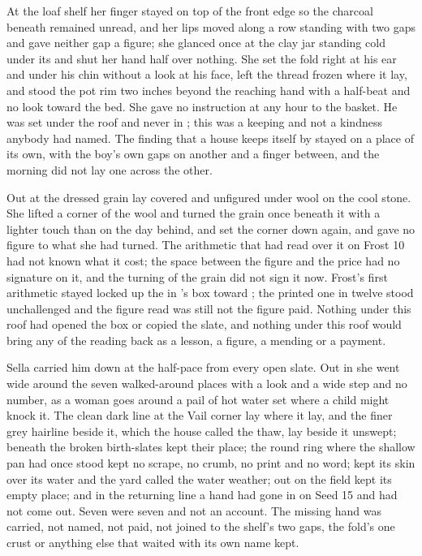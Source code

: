 At the loaf shelf her finger stayed on top of the front edge so the charcoal beneath remained unread, and her lips moved along a row standing with two gaps and gave neither gap a figure; she glanced once at the clay jar standing cold under its  and shut her hand half over nothing. She set the fold right at his ear and under his chin without a look at his face, left the thread frozen where it lay, and stood the pot rim two inches beyond the reaching hand with a half-beat and no look toward the bed. She gave no instruction at any hour to the basket. He was set under the roof and never in ; this was a keeping and not a kindness anybody had named. The finding that a house keeps itself by  stayed on a place of its own, with the boy's own gaps on another and a finger between, and the morning did not lay one across the other.

Out at  the dressed grain lay covered and unfigured under wool on the cool stone. She lifted a corner of the wool and turned the grain once beneath it with a lighter touch than on the day behind, and set the corner down again, and gave no figure to what she had turned. The arithmetic that had read over it on Frost 10 had not known what it cost; the space between the figure and the price had no signature on it, and the turning of the grain did not sign it now. Frost's first arithmetic stayed locked up the  in 's box toward ; the printed one in twelve stood unchallenged and the figure read was still not the figure paid. Nothing under this roof had opened the box or copied the slate, and nothing under this roof would bring any of the reading back as a lesson, a figure, a mending or a payment.

Sella carried him down at the half-pace from every open slate. Out in  she went wide around the seven walked-around places with a look and a wide step and no number, as a woman goes around a pail of hot water set where a child might knock it. The clean dark line at the Vail corner lay where it lay, and the finer grey hairline beside it, which the house called the thaw, lay beside it unswept; beneath  the broken birth-slates kept their place; the round ring where the shallow pan had once stood kept no scrape, no crumb, no print and no word;  kept its skin over its water and the yard called the water weather; out on  the field kept its empty place; and in the returning line a hand had gone in on Seed 15 and had not come out. Seven were seven and not an account. The missing hand was carried, not named, not paid, not joined to the shelf's two gaps, the fold's one crust or anything else that waited with its own name kept.

